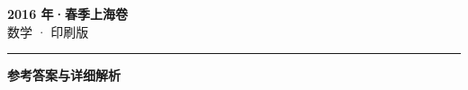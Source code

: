 \documentclass[zihao=5, a4paper]{ctexart}
\begin{document}
\begin{center}
  {\Large\bfseries 2016 年·春季上海卷}\\[4pt]
  {\large 数学 · 印刷版}
\end{center}
\medskip
{}

\par\bigskip\hrule\bigskip
{}
\begin{center}{\large\bfseries 参考答案与详细解析}\end{center}
\smallskip

\end{document}
